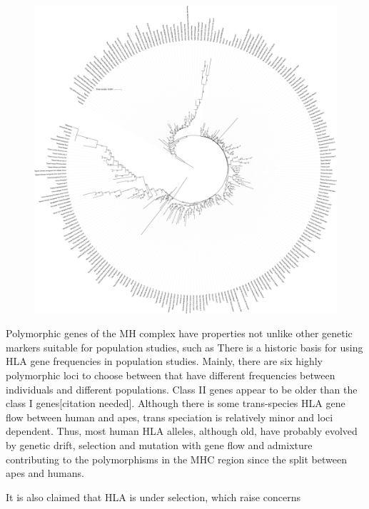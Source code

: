 \documentclass{article}
\begin{document}
\begin{figure}
    \centering
    \includegraphics[width=\textwidth]{Figures/maj_AB_nj_246_99.pdf}
    \label{treeAB}
\end{figure}

Polymorphic genes of the MH complex have properties not unlike other genetic markers suitable for 
population studies, such as 
There is a historic basis for using HLA gene frequencies in population studies. Mainly, there are six highly polymorphic
loci to choose between that have different frequencies between individuals and different populations. Class II genes
appear to be older than the class I genes[citation needed]. Although there is some trans-species HLA gene flow between human and apes,
trans speciation is relatively minor and loci dependent. Thus, most human HLA alleles, although old, have probably
evolved by genetic drift, selection and mutation with gene flow and admixture contributing to the polymorphisms in the
MHC region since the split between apes and humans.


It is also claimed that HLA is under selection, which raise concerns %
\end{document}
